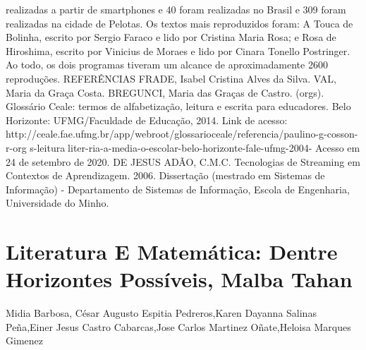 realizadas a partir de smartphones e 40%
foram realizadas no Brasil e 309 foram realizadas na cidade de Pelotas. Os textos mais 
reproduzidos foram: A Touca de Bolinha, escrito por Sergio Faraco e lido por Cristina Maria Rosa; 
e Rosa de Hiroshima, escrito por Vinicius de Moraes e lido por Cinara Tonello Postringer. Ao 
todo, os dois programas tiveram um alcance de aproximadamente 2600 reproduções.
REFERÊNCIAS
FRADE, Isabel Cristina Alves da Silva. VAL, Maria da Graça Costa. BREGUNCI, Maria das 
Graças de Castro. (orgs). Glossário Ceale: termos de alfabetização, leitura e escrita para 
educadores. Belo Horizonte: UFMG/Faculdade de Educação, 2014. Link de acesso: 
http://ceale.fae.ufmg.br/app/webroot/glossarioceale/referencia/paulino-g-cosson-r-org s-leituraliter-ria-a-media-o-escolar-belo-horizonte-fale-ufmg-2004- Acesso em 24 de setembro de 2020. 
DE JESUS ADÃO, C.M.C. Tecnologias de Streaming em Contextos de Aprendizagem. 2006. 
Dissertação (mestrado em Sistemas de Informação) - Departamento de Sistemas de Informação, 
Escola de Engenharia, Universidade do Minho.




\section*{Literatura E Matemática: Dentre Horizontes Possíveis, Malba Tahan}

Midia Barbosa, César Augusto Espitia Pedreros,Karen Dayanna Salinas Peña,Einer Jesus Castro Cabarcas,Jose Carlos Martinez Oñate,Heloisa Marques Gimenez

